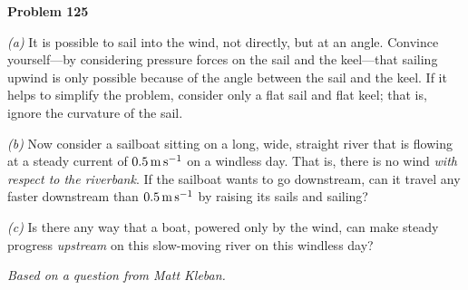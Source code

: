 \documentclass[12pt]{article}
\begin{document}
\begin{pottproblem}
\textbf{Problem 125}

\textsl{(a)}
It is possible to sail into the wind, not directly, but at an angle.
Convince yourself---by considering pressure forces on the sail and
the keel---that sailing upwind is only possible because of the angle
between the sail and the keel. If it helps to simplify the problem,
consider only a flat sail and flat keel; that is, ignore the curvature
of the sail.

\textsl{(b)}
Now consider a sailboat sitting on a long, wide, straight river
that is flowing at a steady current of $0.5\,\mathrm{m}\,\mathrm{s}^{-1}$ on a
windless day. That is, there is no wind \emph{with respect to the riverbank}.
If the sailboat wants to go downstream, can it
travel any faster downstream than $0.5\,\mathrm{m}\,\mathrm{s}^{-1}$ by raising its sails
and sailing?

\textsl{(c)}
Is there any way that a boat, powered only by the wind, can
make steady progress \emph{upstream} on this slow-moving river on
this windless day?

{\normalsize\emph{Based on a question from Matt Kleban.}}
\end{pottproblem}
\end{document}
